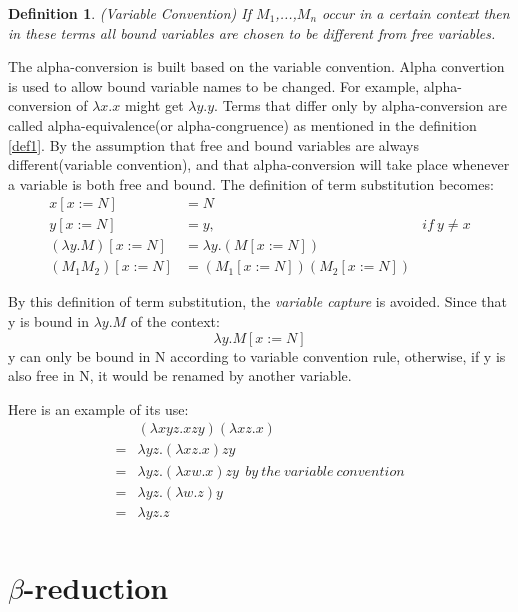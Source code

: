 \documentclass[a4paper,11pt,twoside]{report}
\newtheorem{def1}{\textbf{Definition}}[chapter]
\begin{document}
\begin{def1}
(Variable Convention) If $M_1$,...,$M_n$ occur in a certain context then in these terms all bound variables are chosen to be different from free variables.
\end{def1}

The alpha-conversion is built based on the variable convention. Alpha convertion is used to allow bound variable names to be changed. For example, alpha-conversion of $\lambda x.x$ might get $\lambda y.y$. Terms that differ only by alpha-conversion are called alpha-equivalence(or alpha-congruence) as mentioned in the definition \ref{def1}. By the assumption that free and bound variables are always different(variable convention), and that alpha-conversion will take place whenever a variable is both free and bound. The definition of term substitution becomes:
\begin{equation*}
\begin{array}{rll}
x[x:=N]&=N & ~\\
y[x:=N]&=y,& if\ y\neq x\\
(\lambda y.M)[x:=N]&=\lambda y.(M[x:=N])& \\
(M_1M_2)[x:=N] &= (M_1[x:=N])(M_2[x:=N])&
\end{array} 
\end{equation*}

By this definition of term substitution, the \textit{variable capture} is avoided. Since that y is bound in $\lambda y.M$ of the context:
\begin{equation*}
\lambda y.M[x:=N]
\end{equation*}
y can only be bound in N according to variable convention rule, otherwise, if y is also free in N, it would be renamed by another variable. 

Here is an example of its use:
\begin{equation*}
\begin{array}{ll}
&(\lambda xyz.xzy)(\lambda xz.x)\\
=& \lambda yz.(\lambda xz.x)zy \\
=& \lambda yz.(\lambda xw.x)zy\ \ by\ the\ variable\ convention \\
=& \lambda yz.(\lambda w.z)y\\
=& \lambda yz.z\\
\end{array}
\end{equation*}

\section{$\beta$-reduction}
\end{document}
